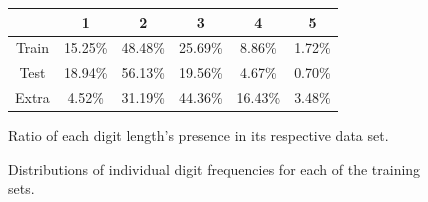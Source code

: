\documentclass[12pt]{article}
\begin{document}
\begin{figure}[!htb]
\begin{center}
\begin{tabular}{ |c|c|c|c|c|c| }
\hline
       & 1       & 2       & 3       & 4       & 5       \\
\hline
Train  & 15.25\% & 48.48\% & 25.69\% & 8.86\%  & 1.72\%  \\
\hline
Test   & 18.94\% & 56.13\% & 19.56\% & 4.67\%  & 0.70\%  \\
\hline
Extra  & 4.52\%  & 31.19\% & 44.36\% & 16.43\% & 3.48\%  \\
\hline
\end{tabular}
\end{center}
\caption{Ratio of each digit length's presence in its respective data set.}
\label{fig:digit_length_table}
\end{figure}

\begin{figure}[!htb]
\centering
{}\hfill
{}\hfill
{}\hfill
\caption{Distributions of individual digit frequencies for each of the training sets.}
\label{fig:digit_freq_plots}
\end{figure}
\end{document}
